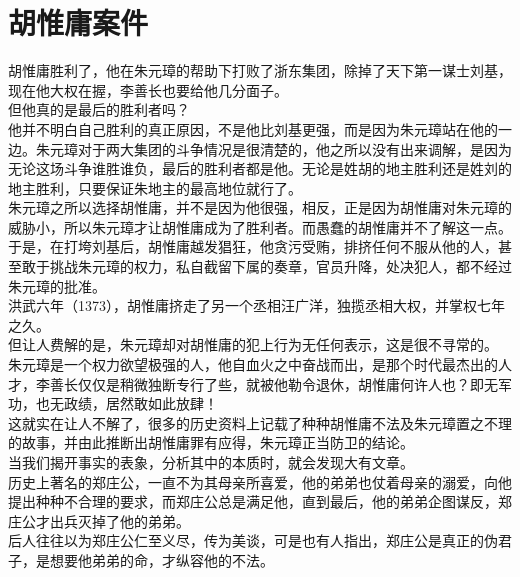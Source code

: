 \section{胡惟庸案件}
\ifnum{}
	\begin{multicols}{\theparacolNo}
\fi
胡惟庸胜利了，他在朱元璋的帮助下打败了浙东集团，除掉了天下第一谋士刘基，现在他大权在握，李善长也要给他几分面子。\\

但他真的是最后的胜利者吗？\\

他并不明白自己胜利的真正原因，不是他比刘基更强，而是因为朱元璋站在他的一边。朱元璋对于两大集团的斗争情况是很清楚的，他之所以没有出来调解，是因为无论这场斗争谁胜谁负，最后的胜利者都是他。无论是姓胡的地主胜利还是姓刘的地主胜利，只要保证朱地主的最高地位就行了。\\

朱元璋之所以选择胡惟庸，并不是因为他很强，相反，正是因为胡惟庸对朱元璋的威胁小，所以朱元璋才让胡惟庸成为了胜利者。而愚蠢的胡惟庸并不了解这一点。\\

于是，在打垮刘基后，胡惟庸越发猖狂，他贪污受贿，排挤任何不服从他的人，甚至敢于挑战朱元璋的权力，私自截留下属的奏章，官员升降，处决犯人，都不经过朱元璋的批准。\\

洪武六年（1373），胡惟庸挤走了另一个丞相汪广洋，独揽丞相大权，并掌权七年之久。\\

但让人费解的是，朱元璋却对胡惟庸的犯上行为无任何表示，这是很不寻常的。\\

朱元璋是一个权力欲望极强的人，他自血火之中奋战而出，是那个时代最杰出的人才，李善长仅仅是稍微独断专行了些，就被他勒令退休，胡惟庸何许人也？即无军功，也无政绩，居然敢如此放肆！\\

这就实在让人不解了，很多的历史资料上记载了种种胡惟庸不法及朱元璋置之不理的故事，并由此推断出胡惟庸罪有应得，朱元璋正当防卫的结论。\\

当我们揭开事实的表象，分析其中的本质时，就会发现大有文章。\\

历史上著名的郑庄公，一直不为其母亲所喜爱，他的弟弟也仗着母亲的溺爱，向他提出种种不合理的要求，而郑庄公总是满足他，直到最后，他的弟弟企图谋反，郑庄公才出兵灭掉了他的弟弟。\\

后人往往以为郑庄公仁至义尽，传为美谈，可是也有人指出，郑庄公是真正的伪君子，是想要他弟弟的命，才纵容他的不法。\\


\end{multicols}
